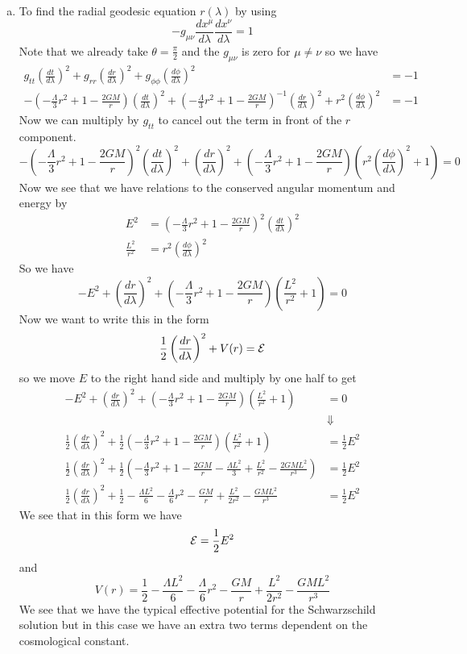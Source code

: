 \documentclass[11pt]{article}
\numberwithin{equation}{section}
\begin{document}
\begin{enumerate}[(a)]
\item
To find the radial geodesic equation $r(\lambda)$ by using 
$$-g_{\mu\nu}\frac{dx^{\mu}}{d\lambda}\frac{dx^{\nu}}{d\lambda} = 1$$ 
Note that we already take $\theta = \frac{\pi}{2}$ and the $g_{\mu\nu}$ is zero for $\mu\ne\nu$ so we have
\begin{align*}
g_{tt}\left(\frac{dt}{d\lambda}\right)^2 + g_{rr}\left(\frac{dr}{d\lambda}\right)^2 + g_{\phi\phi}\left(\frac{d\phi}{d\lambda}\right)^2 &= -1\\
-\left(-\frac{\Lambda}{3}r^2 + 1 - \frac{2GM}{r}\right)\left(\frac{dt}{d\lambda}\right)^2 +  \left(-\frac{\Lambda}{3}r^2 + 1 - \frac{2GM}{r}\right)^{-1}\left(\frac{dr}{d\lambda}\right)^2 + r^2\left(\frac{d\phi}{d\lambda}\right)^2 &= -1
\end{align*}
Now we can multiply by $g_{tt}$ to cancel out the term in front of the $r$ component. 
$$-\left(-\frac{\Lambda}{3}r^2 + 1 - \frac{2GM}{r}\right)^2\left(\frac{dt}{d\lambda}\right)^2 +  \left(\frac{dr}{d\lambda}\right)^2 + \left(-\frac{\Lambda}{3}r^2 + 1 - \frac{2GM}{r}\right)\left(r^2\left(\frac{d\phi}{d\lambda}\right)^2 + 1\right) = 0$$
Now we see that we have relations to the conserved angular momentum and energy by
\begin{align*}
E^2 &= \left(-\frac{\Lambda}{3}r^2 + 1 - \frac{2GM}{r}\right)^2\left(\frac{dt}{d\lambda}\right)^2\\
\frac{L^2}{r^2} &= r^2\left(\frac{d\phi}{d\lambda}\right)^2
\end{align*}
So we have
$$-E^2 + \left(\frac{dr}{d\lambda}\right)^2 + \left(-\frac{\Lambda}{3}r^2 + 1 - \frac{2GM}{r}\right)\left(\frac{L^2}{r^2} + 1\right) = 0$$
Now we want to write this in the form 
$$\frac{1}{2}\left(\frac{dr}{d\lambda}\right)^2 + V(r) = \mathcal{E}$$
so we move $E$ to the right hand side and multiply by one half to get
\begin{align*}
-E^2 + \left(\frac{dr}{d\lambda}\right)^2 + \left(-\frac{\Lambda}{3}r^2 + 1 - \frac{2GM}{r}\right)\left(\frac{L^2}{r^2} + 1\right) &= 0\\
&\Downarrow\\
\frac{1}{2}\left(\frac{dr}{d\lambda}\right)^2 + \frac{1}{2}\left(-\frac{\Lambda}{3}r^2 + 1 - \frac{2GM}{r}\right)\left(\frac{L^2}{r^2} + 1\right) &= \frac{1}{2}E^2\\
\frac{1}{2}\left(\frac{dr}{d\lambda}\right)^2 + \frac{1}{2}\left(-\frac{\Lambda}{3}r^2 + 1 - \frac{2GM}{r}-\frac{\Lambda L^2}{3} + \frac{L^2}{r^2} - \frac{2GML^2}{r^3}\right) &= \frac{1}{2}E^2\\
\frac{1}{2}\left(\frac{dr}{d\lambda}\right)^2 + \frac{1}{2} - \frac{\Lambda L^2}{6}  - \frac{\Lambda}{6}r^2 - \frac{GM}{r} + \frac{L^2}{2r^2} - \frac{GML^2}{r^3} &= \frac{1}{2}E^2
\end{align*}
We see that in this form we have
$$\mathcal{E} = \frac{1}{2}E^2$$
and
$$V(r) =  \frac{1}{2} - \frac{\Lambda L^2}{6}  - \frac{\Lambda}{6}r^2 - \frac{GM}{r} + \frac{L^2}{2r^2} - \frac{GML^2}{r^3}$$
We see that we have the typical effective potential for the Schwarzschild solution but in this case we have an extra two terms dependent on the cosmological constant.


\end{enumerate}
\end{document}
